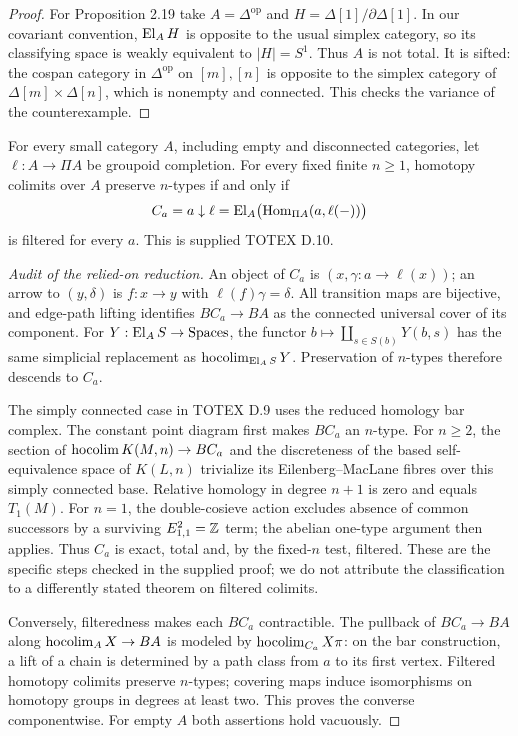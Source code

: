 \begin{proof}
For Proposition 2.19 take $A=\Delta^{\mathrm{op}}$ and
$H=\Delta[1]/\partial\Delta[1]$. In our covariant convention,
$\operatorname{El}_A H$ is opposite to the usual simplex category, so its
classifying space is weakly equivalent to $|H|=S^1$.
Thus $A$ is not total. It is sifted: the cospan category in
$\Delta^{\mathrm{op}}$ on $[m],[n]$ is opposite to the simplex
category of $\Delta[m]\times\Delta[n]$, which is nonempty
and connected. This checks the variance of the counterexample.
\end{proof}

\begin{proposition}\label{D:truncation}
For every small category $A$, including empty and disconnected
categories, let $\ell:A\to\Pi A$ be groupoid completion. For
every fixed finite $n\geq1$, homotopy colimits over $A$ preserve
$n$-types if and only if
\[
 C_a=a\downarrow\ell
 =\operatorname{El}_A\bigl(\operatorname{Hom}_{\Pi A}(a,\ell(-))\bigr)
\]
is filtered for every $a$. This is supplied TOTEX D.10.
\end{proposition}
\begin{proof}[Audit of the relied-on reduction]
An object of $C_a$ is $(x,\gamma:a\to\ell(x))$; an arrow to
$(y,\delta)$ is $f:x\to y$ with $\ell(f)\gamma=\delta$.
All transition maps are bijective, and edge-path lifting identifies
$BC_a\to BA$ as the connected universal cover of its component.
For $Y:\operatorname{El}_A S\to\mathrm{Spaces}$, the functor
$b\mapsto\coprod_{s\in S(b)}Y(b,s)$ has the same simplicial
replacement as $\operatorname*{hocolim}_{\operatorname{El}_A S}Y$. Preservation of $n$-types
therefore descends to $C_a$.

The simply connected case in TOTEX D.9 uses the reduced homology
bar complex. The constant point diagram first makes $BC_a$ an
$n$-type. For $n\geq2$, the section of
$\operatorname*{hocolim} K(M,n)\to BC_a$ and the discreteness of the based
self-equivalence space of $K(L,n)$ trivialize its Eilenberg--MacLane
fibres over this simply connected base. Relative homology in
degree $n+1$ is zero and equals $T_1(M)$. For $n=1$, the
double-cosieve action excludes absence of common successors by
a surviving $E^2_{1,1}=\mathbb Z$ term; the abelian one-type argument
then applies. Thus $C_a$ is exact, total and, by the fixed-$n$
test, filtered. These are the specific steps checked in the
supplied proof; we do not attribute the classification to a
differently stated theorem on filtered colimits.

Conversely, filteredness makes each $BC_a$ contractible. The
pullback of $BC_a\to BA$ along $\operatorname*{hocolim}_A X\to BA$ is
modeled by $\operatorname*{hocolim}_{C_a}X\pi$: on the bar construction, a
lift of a chain is determined by a path class from $a$ to its
first vertex. Filtered homotopy colimits preserve $n$-types;
covering maps induce isomorphisms on homotopy groups in
degrees at least two. This proves the converse componentwise.
For empty $A$ both assertions hold vacuously.
\end{proof}

